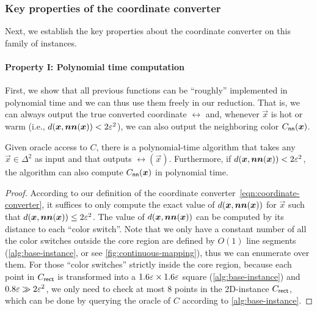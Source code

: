 \subsubsection{Key properties of the coordinate converter}
Next, we establish the key properties about the coordinate converter on this family of instances.

\paragraph{Property I: Polynomial time computation}
First, we show that all previous functions can be 
``roughly'' 
implemented in polynomial time and we can thus use them freely in our reduction.
That is, we can always output the true converted coordinate $\rel$ and, whenever $\vec{x}$ is hot or warm (i.e., $d(\vec{x}, \nn(\vec{x}))<2\eps^2$), we can also output the neighboring color $C_{\sf nn}(\vec{x})$.

\begin{lemma}
    \label{lem:poly-time-oracle-and-converter}
    Given oracle access to $C$, there is a polynomial-time algorithm that takes any $\vec{x}\in \Delta^2$ as input and that outputs 
    $\rel(\vec{x})$.
    Furthermore, if $d(\vec{x}, \nn(\vec{x}))<2\eps^2$, the algorithm can also compute $C_{\sf nn}(\vec{x})$ in polynomial time.
\end{lemma}
\begin{proof}
    According to our definition of the coordinate converter~\cref{eqn:coordinate-converter}, it suffices to only compute the exact value of $d(\vec{x}, \nn(\vec{x}))$ for $\vec{x}$ such that $d(\vec{x}, \nn(\vec{x}))\leq 2\eps^2$.
    The value of $d(\vec{x}, \nn(\vec{x}))$ can be computed by its distance to each ``color switch''. 
    Note that we only have a constant number of all the color switches outside the core  region  are defined by $O(1)$ line segments (\cref{alg:base-instance}, or see \cref{fig:continuous-mapping}), thus we can enumerate over them. 
    For those ``color switches'' strictly inside the core region, because each point in $C_{\rect}$ is transformed into a $1.6\eps\times 1.6\eps$ square (\cref{alg:base-instance}) and $0.8\eps \gg 2\eps^2$, we only need to check at most $8$ points in the 2{\rm D}-\rect\Sperner instance $C_{\rect}$, which can be done by querying the oracle of $C$ according to \cref{alg:base-instance}.
\end{proof}

